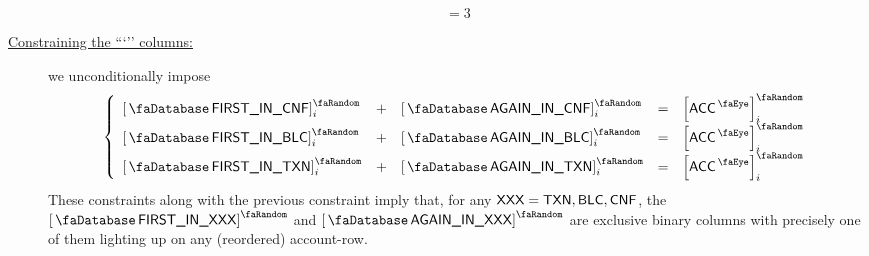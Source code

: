\begin{description}
\[			= 3
		\]
	\item[\underline{\underline{Constraining the ```\col{AGAIN}'' columns:}}]
		we unconditionally impose
		\[
			\left\{ \begin{array}{lclcl}
				\accFirstInConflation  _{i} & + & \accAgainInConflation  _{i} & = & \order{\peekAccount} _{i} \\
				\accFirstInBlock       _{i} & + & \accAgainInBlock       _{i} & = & \order{\peekAccount} _{i} \\
				\accFirstInTransaction _{i} & + & \accAgainInTransaction _{i} & = & \order{\peekAccount} _{i} \\
			\end{array} \right.
		\]
		\saNote{} These constraints along with the previous constraint imply that, for any $\textsf{XXX} = \textsf{TXN}, \textsf{BLC}, \textsf{CNF}$, the 
		$\accFirstInXxx$ and $\accAgainInXxx$ are exclusive binary columns with precisely one of them lighting up on any (reordered) account-row.
\end{description}
